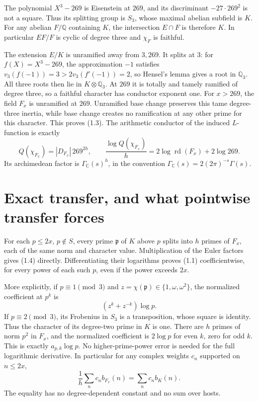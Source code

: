 \documentclass[11pt]{article}
\theoremstyle{remark}\newtheorem{remark}[theorem]{Remark}
\newcommand{\Q}{\mathbb Q}
\newcommand{\rd}{\operatorname{rd}}
\begin{document}
The polynomial $X^3-269$ is Eisenstein at $269$, and its
discriminant $-27\cdot269^2$ is not a square. Thus its splitting
group is $S_3$, whose maximal abelian subfield is $K$.
For any abelian $F/\Q$ containing $K$, the intersection $E\cap F$
is therefore $K$. In particular $EF/F$ is cyclic of degree three
and $\chi_F$ is faithful.

The extension $E/K$ is unramified away from $3,269$. It splits
at $3$: for $f(X)=X^3-269$, the approximation $-1$ satisfies
$v_3(f(-1))=3>2v_3(f'(-1))=2$, so Hensel's lemma gives a root
in $\Q_3$. All three roots then lie in $K\otimes\Q_3$.
At $269$ it is totally and tamely ramified of degree three,
so a faithful character has conductor exponent one.
For $x>269$, the field $F_x$ is unramified at $269$.
Unramified base change preserves this tame degree-three inertia,
while base change creates no ramification at any other prime
for this character. This proves (1.3).
The arithmetic conductor of the induced $L$-function is exactly
\[
       Q(\chi_{F_x})=|D_{F_x}|\,269^{2h},\qquad
 \frac{\log Q(\chi_{F_x})}{h}
          =2\log\rd(F_x)+2\log269.
                                                        \tag{4.9}
\]
Its archimedean factor is $\Gamma_{\mathbb C}(s)^h$, in the
convention $\Gamma_{\mathbb C}(s)=2(2\pi)^{-s}\Gamma(s)$.

\section{Exact transfer, and what pointwise transfer forces}

For each $p\le2x$, $p\notin S$, every prime $\mathfrak p$ of $K$
above $p$ splits into $h$ primes of $F_x$, each of the same norm
and character value. Multiplication of the Euler factors gives
(1.4) directly. Differentiating their logarithms proves (1.1)
coefficientwise, for every power of each such $p$, even if the
power exceeds $2x$.

More explicitly, if $p\equiv1\pmod3$ and
$z=\chi(\mathfrak p)\in\{1,\omega,\omega^2\}$, the normalized
coefficient at $p^k$ is
\[
                         (z^k+z^{-k})\log p.
                                                        \tag{5.1}
\]
If $p\equiv2\pmod3$, its Frobenius in $S_3$ is a transposition,
whose square is identity. Thus the character of its degree-two
prime in $K$ is one. There are $h$ primes of norm $p^2$ in
$F_x$, and the normalized coefficient is $2\log p$ for even
$k$, zero for odd $k$. This is exactly $a_{p,k}\log p$.
No higher-prime-power error is needed for the full logarithmic
derivative. In particular for any complex weights $c_n$ supported
on $n\le2x$,
\[
                 \frac1h\sum_n c_n b_{F_x}(n)
                       =\sum_n c_n b_K(n).
                                                        \tag{5.2}
\]
The equality has no degree-dependent constant and no sum over hosts.
\end{document}
